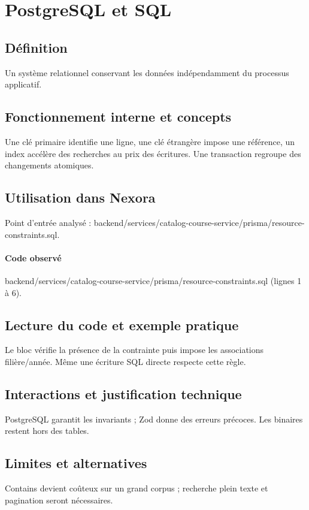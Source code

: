 \section{PostgreSQL et SQL}
\subsection*{Définition}
Un système relationnel conservant les données indépendamment du processus applicatif.

\subsection*{Fonctionnement interne et concepts}
Une clé primaire identifie une ligne, une clé étrangère impose une référence, un index accélère des recherches au prix des écritures. Une transaction regroupe des changements atomiques.

\subsection*{Utilisation dans Nexora}
Point d’entrée analysé : backend/services/catalog-course-service/prisma/resource-constraints.sql.

\paragraph{Code observé} backend/services/catalog-course-service/prisma/resource-constraints.sql (lignes 1 à 6).

\subsection*{Lecture du code et exemple pratique}
Le bloc vérifie la présence de la contrainte puis impose les associations filière/année. Même une écriture SQL directe respecte cette règle.

\subsection*{Interactions et justification technique}
PostgreSQL garantit les invariants ; Zod donne des erreurs précoces. Les binaires restent hors des tables.

\subsection*{Limites et alternatives}
Contains devient coûteux sur un grand corpus ; recherche plein texte et pagination seront nécessaires.

